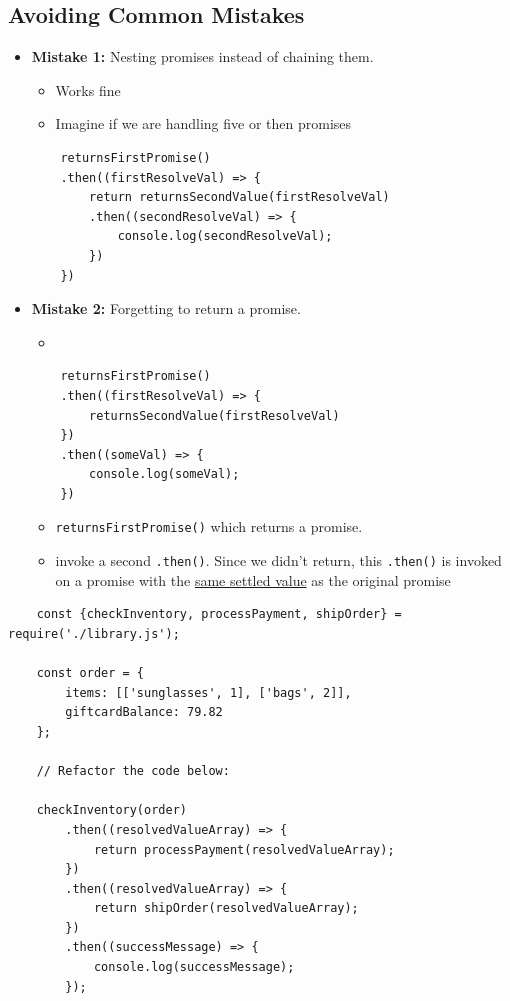\documentclass[12pt]{article}
\begin{document}
\subsection{Avoiding Common Mistakes}
\begin{itemize}
    \item \textbf{Mistake 1:} Nesting promises instead of chaining them.
    \begin{itemize}
        \item Works fine
        \item Imagine if we are handling five or then promises
    \end{itemize}
    \begin{lstlisting}
    returnsFirstPromise()
    .then((firstResolveVal) => {
        return returnsSecondValue(firstResolveVal)
        .then((secondResolveVal) => {
            console.log(secondResolveVal);
        })
    })
    \end{lstlisting}

    \item \textbf{Mistake 2:} Forgetting to return a promise.
    \begin{itemize}
        \item
    \end{itemize}

    \begin{lstlisting}
    returnsFirstPromise()
    .then((firstResolveVal) => {
        returnsSecondValue(firstResolveVal)
    })
    .then((someVal) => {
        console.log(someVal);
    })
    \end{lstlisting}

    \begin{itemize}
        \item \texttt{returnsFirstPromise()} which returns a promise.
        \item invoke a second \texttt{.then()}. Since we didn’t return, this \texttt{.then()} is invoked on a promise with the \ul{same settled value} as the original promise
    \end{itemize}
\end{itemize}

    \begin{lstlisting}
    const {checkInventory, processPayment, shipOrder} = require('./library.js');

    const order = {
        items: [['sunglasses', 1], ['bags', 2]],
        giftcardBalance: 79.82
    };

    // Refactor the code below:

    checkInventory(order)
        .then((resolvedValueArray) => {
            return processPayment(resolvedValueArray);
        })
        .then((resolvedValueArray) => {
            return shipOrder(resolvedValueArray);
        })
        .then((successMessage) => {
            console.log(successMessage);
        });
    \end{lstlisting}
\end{document}
